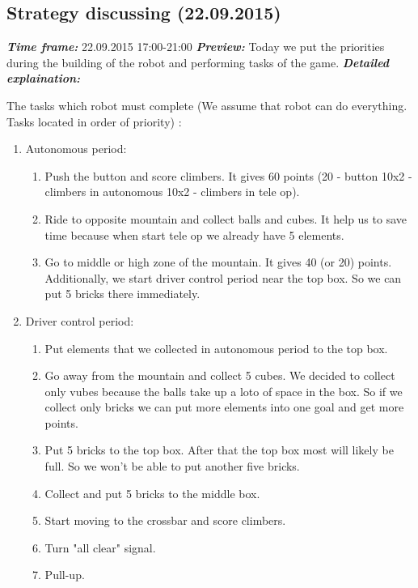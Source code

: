 \subsection{Strategy discussing (22.09.2015)}
\textit{\textbf{Time frame:}} 22.09.2015 17:00-21:00 \newline
\textit{\textbf{Preview:}} Today we put the priorities during the building of the robot and performing tasks of the game.\newline \newline
\textit{\textbf{Detailed explaination:}}
\begin{enumerate*}
	\item The tasks which robot must complete (We assume that robot can do everything. Tasks located in order of priority) :
	\begin{enumerate}
		\item Autonomous period:
		\begin{enumerate}
			\item Push the button and score climbers. It gives 60 points (20 - button 10x2 - climbers in autonomous 10x2 - climbers in tele op).
			\item Ride to opposite mountain and collect balls and cubes. It help us to save time because when start tele op we already have 5 elements. 
			\item Go to middle or high zone of the mountain. It gives 40 (or 20) points. Additionally, we start driver control period near the top box. So we can put 5 bricks there immediately.
		\end{enumerate}
		\item Driver control period:
		\begin{enumerate}
			\item Put elements that we collected in autonomous period to the top box.
			\item Go away from the mountain and collect 5 cubes. We decided to collect only vubes because the balls take up a loto of space in the box. So if we collect only bricks we can put more elements into one goal and get more points.
			\item Put 5 bricks to the top box. After that the top box most will likely be full. So we won't be able to put another five bricks.
			\item Collect and put 5 bricks to the middle box.
			\item Start moving to the crossbar and score climbers.
			\item Turn "all clear" signal.
			\item Pull-up.

\end{enumerate}
\end{enumerate}
\end{enumerate*}
